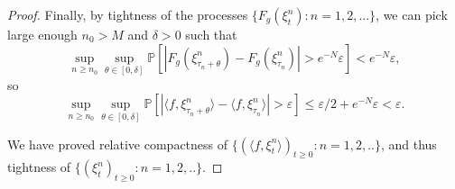 \begin{proof}
Finally, by tightness of the processes $\{F_g(\xi^n_t): n = 1,2,...\}$, 
we can pick large enough $n_0 > M$ and $\delta > 0$
such that 
$$\sup_{n \geq n_0}\sup_{\theta \in [0,\delta]}\mathbb{P}\left[|F_g(\xi^n_{\tau_n+\theta})-F_g(\xi^n_{\tau_n})| > e^{-N}\varepsilon\right]< e^{-N}\varepsilon,$$
so
\begin{equation}
\sup_{n \geq n_0}\sup_{\theta \in [0, \delta]} \mathbb{P}\left[|\langle f, \xi^n_{\tau_n+\theta}\rangle - \langle f, \xi^n_{\tau_n}\rangle | > \varepsilon \right] \leq \varepsilon / 2 + e^{-N} \varepsilon < \varepsilon.
\end{equation}

We have proved relative compactness of $\{(\langle f, \xi^n_t \rangle )_{t \geq 0}: n=1,2,.. \}$, and thus tightness of 
 $\{(\xi^n_t )_{t \geq 0}: n=1,2,.. \}.$
\end{proof}



